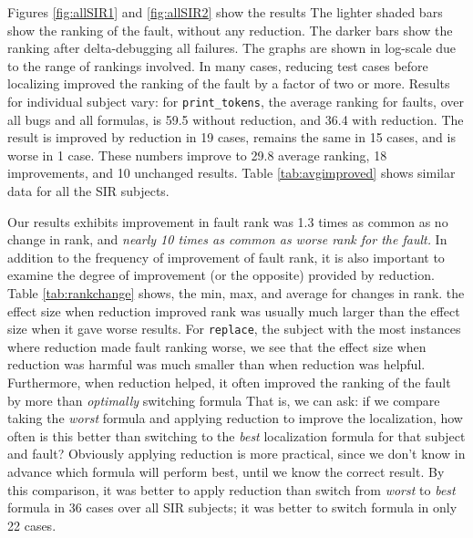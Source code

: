 Figures \ref{fig:allSIR1} and \ref{fig:allSIR2} show the
results
The
lighter shaded bars show the ranking of the fault, without any
reduction.  The darker bars show the ranking after delta-debugging all
failures.  The graphs are shown in log-scale due to the range of
rankings involved.  In many cases, reducing test cases before
localizing improved the ranking of the fault by a factor of two or
more.  Results for individual subject vary: for {\tt print\_tokens},
the average ranking for faults, over all bugs and all formulas, is
59.5 without reduction, and 36.4 with reduction.  The result is
improved by reduction in 19 cases, remains the same in 15 cases, and
is worse in 1 case.  These numbers improve to 29.8 average ranking, 18
improvements, and 10 unchanged results.
Table \ref{tab:avgimproved} shows similar data for all the SIR
subjects.  

Our results exhibits improvement in fault rank was 1.3 times as common as no change
in rank, and \emph{nearly 10 times as common as worse rank for the
fault.}  In addition to the frequency of improvement of fault rank, it
is also important to examine the degree of improvement (or the
opposite) provided by reduction.  Table \ref{tab:rankchange} shows,
the min, max, and average for changes in rank.  the effect
size when reduction improved rank was usually much larger than the
effect size when it gave worse results.  For {\tt replace}, the
subject with the most instances where reduction made fault ranking
worse, we see that the effect size when reduction was harmful was much
smaller than when reduction was helpful.  Furthermore, when reduction
helped, it often improved the ranking of the fault by more than
\emph{optimally} switching formula  That is, we can ask: if we compare
taking the \emph{worst} formula and applying reduction to improve the
localization, how often is this better than switching to the
\emph{best} localization formula for that subject and fault?
Obviously applying reduction is more practical, since we don't know in
advance which formula will perform best, until we know the correct
result.  By this comparison, it was better to
apply reduction than switch from \emph{worst} to \emph{best} formula
in 36 cases over all SIR subjects;  it was better to switch formula in
only 22 cases.



